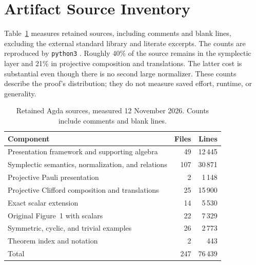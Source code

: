 \section{Artifact Source Inventory}\label{sec:source-inventory}

Table~\ref{tab:stats} measures retained sources, including comments and
blank lines, excluding the external standard library and literate
excerpts. The counts are reproduced by
\texttt{python3} . Roughly 40\% of the source remains
in the symplectic layer and 21\% in projective composition and
translations. The latter cost is substantial even though there is no
second large normalizer. These counts describe the proof's distribution;
they do not measure saved effort, runtime, or generality.

\begin{table}[htbp]
\caption{Retained Agda sources, measured 12 November 2026.
Counts include comments and blank lines.}
\label{tab:stats}
\centering\small
\begin{tabular}{@{}lrr@{}}
\toprule
Component & Files & Lines \\
\midrule
Presentation framework and supporting algebra & 49 & 12\,445 \\
Symplectic semantics, normalization, and relations & 107 & 30\,871 \\
Projective Pauli presentation & 2 & 1\,148 \\
Projective Clifford composition and translations & 25 & 15\,900 \\
Exact scalar extension & 14 & 5\,530 \\
Original Figure~1 with scalars & 22 & 7\,329 \\
Symmetric, cyclic, and trivial examples & 26 & 2\,773 \\
Theorem index and notation & 2 & 443 \\
\midrule
Total & 247 & 76\,439 \\
\bottomrule
\end{tabular}
\end{table}

